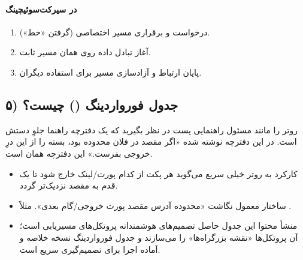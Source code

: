 \paragraph{در سیرکت‌سوئیچینگ}
\begin{enumerate}
  \item درخواست و برقراری مسیر اختصاصی (گرفتن «خط»).
  \item آغاز تبادل داده روی همان مسیر ثابت.
  \item پایان ارتباط و آزادسازی مسیر برای استفاده دیگران.
\end{enumerate}

\subsection*{۵) جدول فورواردینگ () چیست؟}
روتر را مانند مسئول راهنمایی پست در نظر بگیرید که یک دفترچه راهنما جلوِ دستش است. در این دفترچه نوشته شده «اگر مقصد در فلان محدوده بود، بسته را از این درِ خروجی بفرست.» این دفترچه همان  است.
\begin{itemize}
  \item کارکرد به روتر خیلی سریع می‌گوید هر پکت از کدام پورت/لینک خارج شود تا یک قدم به مقصد نزدیک‌تر گردد.
  \item ساختار معمول نگاشت «محدوده آدرس مقصد  پورت خروجی/گام بعدی». مثلاً   .
  \item منشأ محتوا این جدول حاصل تصمیم‌های هوشمندانه پروتکل‌های مسیریابی است؛ آن پروتکل‌ها «نقشه بزرگراه‌ها» را می‌سازند و جدول فورواردینگ نسخه خلاصه و آماده اجرا برای تصمیم‌گیری سریع است.
\end{itemize}
